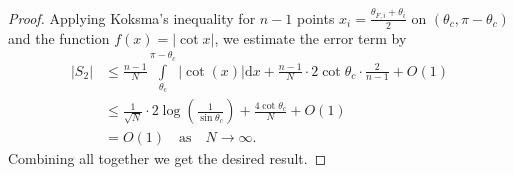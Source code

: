\documentclass[10pt,a4paper]{amsart}
\begin{document}
\begin{proof}
Applying Koksma's inequality for $n-1$ points $x_i=\frac{\theta_{F,i}+\theta_i}{2}$ on $(\theta_c,\pi-\theta_c)$ and the function $f(x)=|\cot x|$, we estimate the error term by
\begin{align*}
   |S_2| &\leq \frac{n-1}{N}\int\limits_{\theta_c}^{\pi-\theta_c}|\cot(x)|\mathrm{d}x+\frac{n-1}{N}\cdot 2\cot \theta_c\cdot \frac{2}{n-1}+O(1)
    \\ &\leq\frac{1}{\sqrt{N}}\cdot 2\log\left(\frac{1}{\sin\theta_c}\right)+\frac{4\cot \theta_c}{N}+O(1)
    \\ & =O\left(1\right)\quad \text{as}\quad N\rightarrow\infty.
\end{align*}
Combining all together we get the desired result.
\end{proof} 
\end{document}
